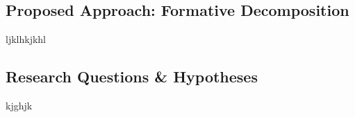 




\subsection{Proposed Approach: Formative Decomposition}

ljklhkjkhl


\subsection{Research Questions \& Hypotheses}


kjghjk